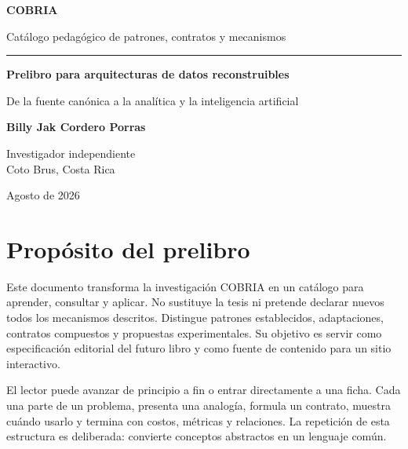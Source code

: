 \documentclass[11pt,oneside]{book}
\begin{document}
\frontmatter
\hypersetup{pageanchor=false}
\begin{titlepage}\thispagestyle{empty}
\vspace*{2cm}\begin{center}
{\fontsize{34}{38}\selectfont\bfseries COBRIA\par}\vspace{.4cm}
{\Large Catálogo pedagógico de patrones, contratos y mecanismos\par}
\vspace{1.2cm}\rule{.72\textwidth}{.7pt}\par\vspace{1.2cm}
{\huge\bfseries Prelibro para arquitecturas de datos reconstruibles\par}
\vspace{.8cm}
{\Large De la fuente canónica a la analítica y la inteligencia artificial\par}
\vfill
{\large\bfseries Billy Jak Cordero Porras\par}\vspace{.3cm}
{\normalsize Investigador independiente\\Coto Brus, Costa Rica\par}\vspace{.5cm}
{\normalsize Agosto de 2026\par}
\end{center}\end{titlepage}
\hypersetup{pageanchor=true}\setcounter{page}{1}

\chapter*{Propósito del prelibro}
Este documento transforma la investigación COBRIA en un catálogo para aprender,
consultar y aplicar. No sustituye la tesis ni pretende declarar nuevos todos los
mecanismos descritos. Distingue patrones establecidos, adaptaciones, contratos
compuestos y propuestas experimentales. Su objetivo es servir como especificación
editorial del futuro libro y como fuente de contenido para un sitio interactivo.

El lector puede avanzar de principio a fin o entrar directamente a una ficha. Cada una
parte de un problema, presenta una analogía, formula un contrato, muestra cuándo usarlo
y termina con costos, métricas y relaciones. La repetición de esta estructura es
deliberada: convierte conceptos abstractos en un lenguaje común.
\end{document}
